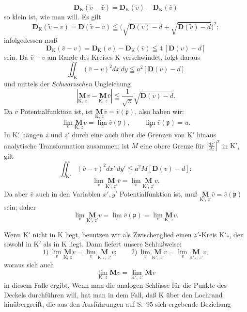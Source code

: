 \documentclass{article}
\begin{document}
\[ \mathbf{D}_{\mathrm{K}}(\tilde{v} - \bar{v}) = \mathbf{D}_{\mathrm{K}}(\tilde{v}) - \mathbf{D}_{\mathrm{K}}(\bar{v}) \]
so klein ist, wie man will. Es gilt
\[ \mathbf{D}_{\mathrm{K}}(\tilde{v} - v) = \mathbf{D}(\tilde{v} - v) \leqq \bigl( \sqrt{\mathbf{D}(v) - d} + \sqrt{\mathbf{D}(\tilde{v}) - d} \bigr)^2; \]
infolgedessen muß
\[ \mathbf{D}_{\mathrm{K}}(\bar{v} - v) = \mathbf{D}_{\mathrm{K}}(v) - \mathbf{D}_{\mathrm{K}}(\bar{v}) \leqq 4\,[\mathbf{D}(v) - d] \]
sein. Da $\bar{v} - v$ am Rande des Kreises $\mathrm{K}$ verschwindet, folgt daraus
\[ \iint_{\mathrm{K}} (\bar{v} - v)^2 dx\,dy \leqq a^2 [\mathbf{D}(v) - d] \]
und mittels der \emph{Schwarzschen} Ungleichung
\[ \left| \underset{\mathrm{K},\,z}{\mathbf{M}} v - \underset{\mathrm{K},\,z}{\mathbf{M}} \bar{v} \right| \leqq \frac{1}{\sqrt{\pi}} \sqrt{\mathbf{D}(v) - d}. \]
Da $\bar{v}$ Potentialfunktion ist, ist $\underset{\mathrm{K},\,z}{\mathbf{M}} \bar{v} = \bar{v}(\mathfrak{p})$, also haben wir:
\[ \lim_v \underset{\mathrm{K},\,z}{\mathbf{M}} v = \lim_v \bar{v}(\mathfrak{p}), \qquad \lim_v \bar{v}(\mathfrak{p}) = u. \]
In $\mathrm{K}'$ hängen $z$ und $z'$ durch eine auch über die Grenzen von $\mathrm{K}'$ hinaus analytische Transformation zusammen; ist $M$ eine obere Grenze für $\left|\frac{dz'}{dz}\right|^2$ in $\mathrm{K}'$, gilt
\[ \iint_{\mathrm{K}'} (\bar{v} - v)^2 dx'\,dy' \leqq a^2 M [\mathbf{D}(v) - d]\colon \]
\[ \lim_v \underset{\mathrm{K}',\,z'}{\mathbf{M}} \bar{v} = \lim_v \underset{\mathrm{K}',\,z'}{\mathbf{M}} v. \]
Da aber $\bar{v}$ auch in den Variablen $x', y'$ Potentialfunktion ist, muß $\underset{\mathrm{K}',\,z'}{\mathbf{M}} \bar{v} = \bar{v}(\mathfrak{p})$ sein; daher
\[ \lim_v \underset{\mathrm{K}',\,z'}{\mathbf{M}} v = \lim_v \bar{v}(\mathfrak{p}) = \lim_v \underset{\mathrm{K},\,z}{\mathbf{M}} v. \]

Wenn $\mathrm{K}'$ nicht in $\mathrm{K}$ liegt, benutzen wir als Zwischenglied einen $z'$-Kreis $\mathrm{K}'_*$, der sowohl in $\mathrm{K}'$ als in $\mathrm{K}$ liegt. Dann liefert unsere Schlußweise:
\[ \text{1)}\ \lim_v \underset{\mathrm{K},\,z}{\mathbf{M}} v = \lim_v \underset{\mathrm{K}'_*,\,z'}{\mathbf{M}} v; \qquad \text{2)}\ \lim_v \underset{\mathrm{K}',\,z'}{\mathbf{M}} v = \lim_v \underset{\mathrm{K}'_*,\,z'}{\mathbf{M}} v, \]
woraus sich auch
\[ \lim_{\mathrm{K},\,z} \mathbf{M} v = \lim_{\mathrm{K}',\,z'} \mathbf{M} v \]
in diesem Falle ergibt. Wenn man die analogen Schlüsse für die Punkte des Deckels durchführen will, hat man in dem Fall, daß $\mathrm{K}$ über den Lochrand hinübergreift, die aus den Ausführungen auf S.~95 sich ergebende Beziehung
\end{document}
